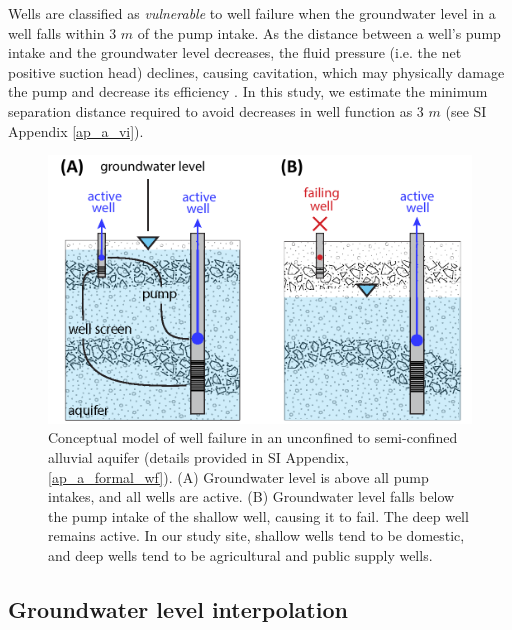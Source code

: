 Wells are classified as \textit{vulnerable} to well failure when the groundwater level in a well falls within 3 $m$ of the pump intake. As the distance between a well's pump intake and the groundwater level decreases, the fluid pressure (i.e. the net positive suction head) declines, causing cavitation, which may physically damage the pump and decrease its efficiency \citep{Tullis1989, Helweg1983}. In this study, we estimate the minimum separation distance required to avoid decreases in well function as 3 $m$ (see SI Appendix \ref{ap_a_vi}).

\begin{figure}%
	\centering
	\includegraphics[width=\linewidth]{ch2_figs/fig_conceptual_mod.pdf}
	\caption{Conceptual model of well failure in an unconfined to semi-confined alluvial aquifer (details provided in SI Appendix, \ref{ap_a_formal_wf}). (A) Groundwater level is above all pump intakes, and all wells are active. (B) Groundwater level falls below the pump intake of the shallow well, causing it to fail. The deep well remains active. In our study site, shallow wells tend to be domestic, and deep wells tend to be agricultural and public supply wells.}
	\label{fig:conceptual_model_wf}
\end{figure}


\subsection{Groundwater level interpolation}

